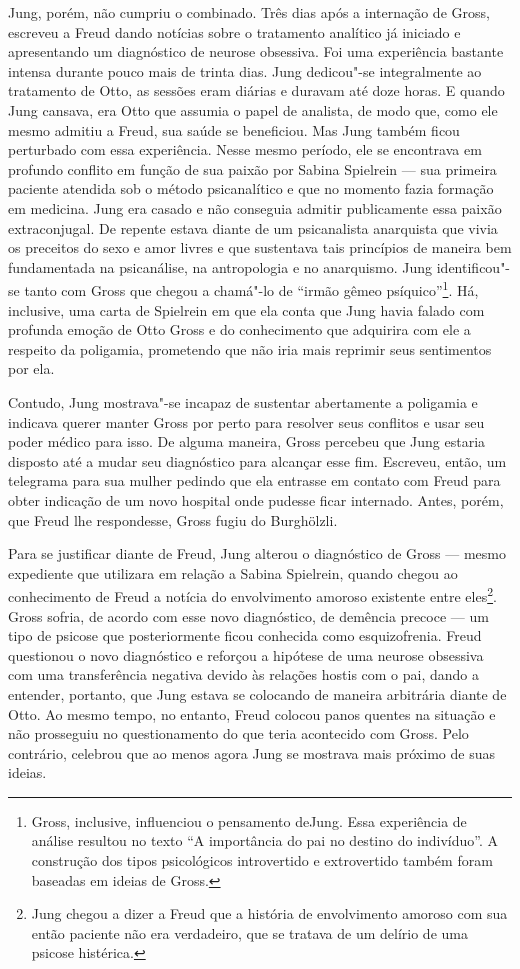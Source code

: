 Jung, porém, não cumpriu o combinado. Três dias após a internação de
Gross, escreveu a Freud dando notícias sobre o tratamento analítico já
iniciado e apresentando um diagnóstico de neurose obsessiva. Foi uma
experiência bastante intensa durante pouco mais de trinta dias. Jung
dedicou"-se integralmente ao tratamento de Otto, as sessões eram diárias
e duravam até doze horas. E quando Jung cansava, era Otto que assumia o
papel de analista, de modo que, como ele mesmo admitiu a Freud, sua
saúde se beneficiou. Mas Jung também ficou perturbado com essa
experiência. Nesse mesmo período, ele se encontrava em profundo conflito
em função de sua paixão por Sabina Spielrein --- sua primeira paciente
atendida sob o método psicanalítico e que no momento fazia formação em
medicina. Jung era casado e não conseguia admitir publicamente essa
paixão extraconjugal. De repente estava diante de um psicanalista
anarquista que vivia os preceitos do sexo e amor livres e que sustentava
tais princípios de maneira bem fundamentada na psicanálise, na
antropologia e no anarquismo. Jung identificou"-se tanto com Gross que
chegou a chamá"-lo de ``irmão gêmeo psíquico''\footnote{Gross, inclusive,
  influenciou o pensamento deJung. Essa experiência de análise resultou
  no texto ``A importância do pai no destino do indivíduo''. A
  construção dos tipos psicológicos introvertido e extrovertido também
  foram baseadas em ideias de Gross.}. Há, inclusive, uma carta de
Spielrein em que ela conta que Jung havia falado com profunda emoção de
Otto Gross e do conhecimento que adquirira com ele a respeito da
poligamia, prometendo que não iria mais reprimir seus sentimentos por
ela.

Contudo, Jung mostrava"-se incapaz de sustentar abertamente a poligamia e
indicava querer manter Gross por perto para resolver seus conflitos e
usar seu poder médico para isso. De alguma maneira, Gross percebeu que
Jung estaria disposto até a mudar seu diagnóstico para alcançar esse
fim. Escreveu, então, um telegrama para sua mulher pedindo que ela
entrasse em contato com Freud para obter indicação de um novo hospital
onde pudesse ficar internado. Antes, porém, que Freud lhe respondesse,
Gross fugiu do Burghölzli.

Para se justificar diante de Freud, Jung alterou o diagnóstico de Gross
--- mesmo expediente que utilizara em relação a Sabina Spielrein, quando
chegou ao conhecimento de Freud a notícia do envolvimento amoroso
existente entre eles\footnote{Jung chegou a dizer a Freud que a história
  de envolvimento amoroso com sua então paciente não era verdadeiro, que
  se tratava de um delírio de uma psicose histérica.}. Gross sofria, de
acordo com esse novo diagnóstico, de demência precoce --- um tipo de
psicose que posteriormente ficou conhecida como esquizofrenia. Freud
questionou o novo diagnóstico e reforçou a hipótese de uma neurose
obsessiva com uma transferência negativa devido às relações hostis com o
pai, dando a entender, portanto, que Jung estava se colocando de maneira
arbitrária diante de Otto. Ao mesmo tempo, no entanto, Freud colocou
panos quentes na situação e não prosseguiu no questionamento do que
teria acontecido com Gross. Pelo contrário, celebrou que ao menos agora
Jung se mostrava mais próximo de suas ideias.

